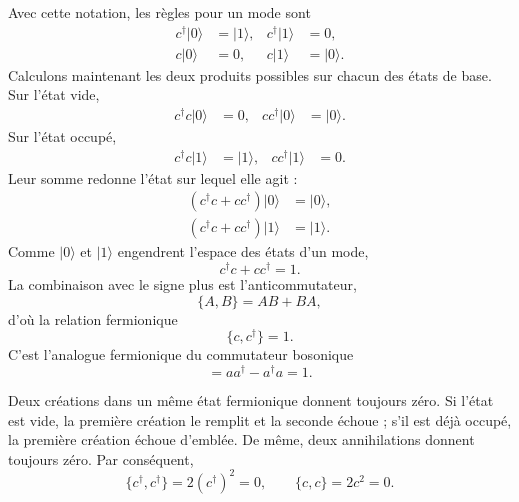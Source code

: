 \begin{classroomqa}
\end{classroomqa}

Avec cette notation, les règles pour un mode sont
\begin{align}
c^\dagger|0\rangle&=|1\rangle,
&c^\dagger|1\rangle&=0,
\\
c|0\rangle&=0,
&c|1\rangle&=|0\rangle.
\end{align}
Calculons maintenant les deux produits possibles sur chacun des états de base. Sur l’état vide,
\begin{align}
c^\dagger c|0\rangle&=0,
&
cc^\dagger|0\rangle&=|0\rangle.
\end{align}
Sur l’état occupé,
\begin{align}
c^\dagger c|1\rangle&=|1\rangle,
&
cc^\dagger|1\rangle&=0.
\end{align}
Leur somme redonne l’état sur lequel elle agit :
\begin{align}
(c^\dagger c+cc^\dagger)|0\rangle&=|0\rangle,
\\
(c^\dagger c+cc^\dagger)|1\rangle&=|1\rangle.
\end{align}
Comme \(|0\rangle\) et \(|1\rangle\) engendrent l’espace des états d’un mode,
\begin{equation}
c^\dagger c+cc^\dagger=1.
\end{equation}
La combinaison avec le signe plus est l’anticommutateur,
\begin{equation}
\{A,B\}=AB+BA,
\end{equation}
d’où la relation fermionique
\begin{equation}
\{c,c^\dagger\}=1.
\end{equation}
C’est l’analogue fermionique du commutateur bosonique
\begin{equation}
[a,a^\dagger]=aa^\dagger-a^\dagger a=1.
\end{equation}

Deux créations dans un même état fermionique donnent toujours zéro. Si l’état est vide, la première création le remplit et la seconde échoue ; s’il est déjà occupé, la première création échoue d’emblée. De même, deux annihilations donnent toujours zéro. Par conséquent,
\begin{equation}
\{c^\dagger,c^\dagger\}=2(c^\dagger)^2=0,
\qquad
\{c,c\}=2c^2=0.
\end{equation}

